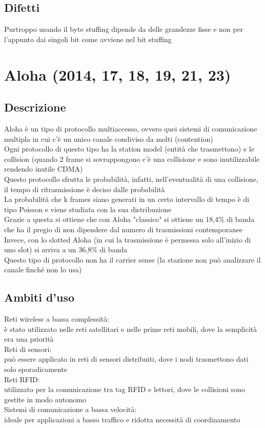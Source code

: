 \documentclass[10pt,oneside,a4paper]{article}
\begin{document}
\subsection{Difetti}
Purtroppo usando il byte stuffing dipende da delle grandezze fisse e non per l'appunto dai singoli bit come avviene nel bit stuffing
\section{Aloha (2014, 17, 18, 19, 21, 23)}
\subsection{Descrizione}
Aloha è un tipo di protocollo multiaccesso, ovvero quei sistemi di comunicazione multipla in cui c'è un unico canale condiviso da molti (contention)\\
Ogni protocollo di questo tipo ha la station model (entità che trasmettono) e le collision (quando 2 frame si sovrappongono c'è una collisione e sono inutilizzabile rendendo inutile CDMA)\\
Questo protocollo sfrutta le probabilità, infatti, nell'eventualità di una collisione, il tempo di ritrasmissione è deciso dalle probabilità\\
La probabilità che k frames siano generati in un certo intervallo di tempo è di tipo Poisson e viene studiata con la sua distribuzione\\
Grazie a questa si ottiene che con Aloha "classico" si ottiene un 18,4$\%$ di banda che ha il pregio di non dipendere dal numero di trasmissioni contemporanee\\
Invece, con lo slotted Aloha (in cui la trasmissione è permessa solo all'inizio di uno slot) si arriva a un 36,8$\%$ di banda\\
Questo tipo di protocollo non ha il carrier sense (la stazione non può analizzare il canale finché non lo usa)
\subsection{Ambiti d'uso}
Reti wireless a bassa complessità:\\
è stato utilizzato nelle reti satellitari e nelle prime reti mobili, dove la semplicità era una priorità\\
Reti di sensori:\\
può essere applicato in reti di sensori distribuiti, dove i nodi trasmettono dati solo sporadicamente\\
Reti RFID:\\
utilizzato per la comunicazione tra tag RFID e lettori, dove le collisioni sono gestite in modo autonomo\\
Sistemi di comunicazione a bassa velocità:\\
ideale per applicazioni a basso traffico e ridotta necessità di coordinamento
\end{document}
